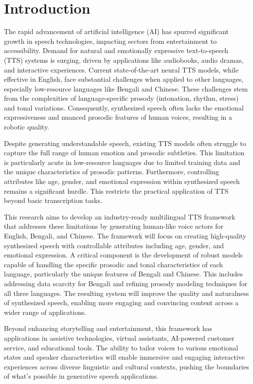 \section*{Introduction}

The rapid advancement of artificial intelligence (AI) has spurred significant growth in speech technologies, impacting sectors from entertainment to accessibility. Demand for natural and emotionally expressive text-to-speech (TTS) systems is surging, driven by applications like audiobooks, audio dramas, and interactive experiences. Current state-of-the-art neural TTS models, while effective in English, face substantial challenges when applied to other languages, especially low-resource languages like Bengali and Chinese. These challenges stem from the complexities of language-specific prosody (intonation, rhythm, stress) and tonal variations. Consequently, synthesized speech often lacks the emotional expressiveness and nuanced prosodic features of human voices, resulting in a robotic quality. \newline

Despite generating understandable speech, existing TTS models often struggle to capture the full range of human emotion and prosodic subtleties. This limitation is particularly acute in low-resource languages due to limited training data and the unique characteristics of prosodic patterns. Furthermore, controlling attributes like age, gender, and emotional expression within synthesized speech remains a significant hurdle. This restricts the practical application of TTS beyond basic transcription tasks. \newline

This research aims to develop an industry-ready multilingual TTS framework that addresses these limitations by generating human-like voice actors for English, Bengali, and Chinese. The framework will focus on creating high-quality synthesized speech with controllable attributes including age, gender, and emotional expression. A critical component is the development of robust models capable of handling the specific prosodic and tonal characteristics of each language, particularly the unique features of Bengali and Chinese. This includes addressing data scarcity for Bengali and refining prosody modeling techniques for all three languages. The resulting system will improve the quality and naturalness of synthesized speech, enabling more engaging and convincing content across a wider range of applications. \newline

Beyond enhancing storytelling and entertainment, this framework has applications in assistive technologies, virtual assistants, AI-powered customer service, and educational tools. The ability to tailor voices to various emotional states and speaker characteristics will enable immersive and engaging interactive experiences across diverse linguistic and cultural contexts, pushing the boundaries of what's possible in generative speech applications.
